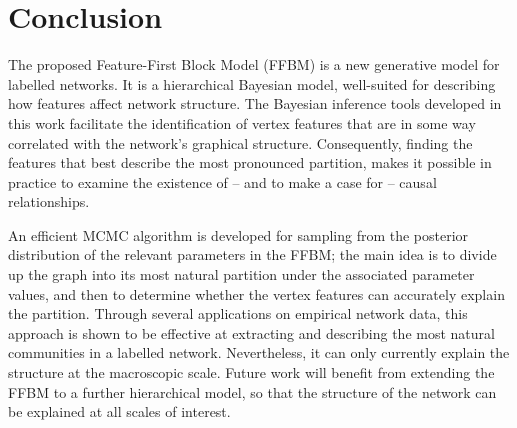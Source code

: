 \section{Conclusion}
\label{sec:conclusion}

The proposed Feature-First Block Model (FFBM)
is a new generative model for labelled networks.
It is a hierarchical Bayesian model, 
well-suited for describing how features
affect network structure.
The Bayesian inference tools developed in this 
work facilitate the identification of 
vertex features that are in some way 
correlated with the network's graphical structure.
Consequently, 
finding the features that best describe the most 
pronounced partition, makes it possible in practice
to examine the existence of -- and to make a case for --
causal relationships.

An efficient MCMC algorithm 
is developed for sampling 
from the posterior distribution of
the relevant parameters in the FFBM;
the main idea is to divide up the graph into 
its most natural partition under the associated
parameter values, and then to determine whether 
the vertex features can accurately explain the partition. 
Through several applications on empirical
network data, this approach 
is shown to be effective at extracting and describing 
the most natural communities in a labelled network. 
Nevertheless, it
can only currently explain the structure at the macroscopic
scale. Future work will benefit from extending 
the FFBM to a further hierarchical model,
so that
the structure of the network 
can be explained at all scales of interest.


